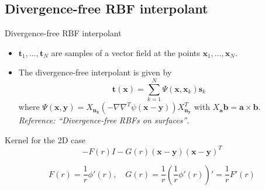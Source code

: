 \documentclass{beamer}
\begin{document}
\subsection{Divergence-free RBF interpolant}
\begin{frame}{Divergence-free RBF interpolant}
  \begin{itemize}
    \item $\mathbf{t}_1,\ldots,\mathbf{t}_N$ are samples of a vector field at
      the points $\mathbf{x}_1,\ldots,\mathbf{x}_N$.
      
    \item The divergence-free interpolant is given by
      \begin{equation*}
	\mathbf{t}(\mathbf{x}) = \sum_{k = 1}^{N}
	{\Psi(\mathbf{x},\mathbf{x}_k)\mathbf{s}_k}
      \end{equation*}
      where $\Psi(\mathbf{x},\mathbf{y}) = X_\mathbf{n_x}
      (-\nabla\nabla^T\psi(\mathbf{x} - \mathbf{y}))X_{\mathbf{n_y}}^T$ with
      $X_\mathbf{a}\mathbf{b} = \mathbf{a}\times\mathbf{b}$. \emph{Reference:
	``Divergence-free RBFs on surfaces''}.
  \end{itemize}
\end{frame}

\begin{frame}{Kernel for the 2D case}
  \begin{equation*}
    -F(r)I - G(r)(\mathbf{x} - \mathbf{y})(\mathbf{x} - \mathbf{y})^T
  \end{equation*}

  \begin{equation*}
    F(r) = \frac{1}{r}\phi'(r), \quad G(r) = 
    \frac{1}{r}\left(\frac{1}{r}\phi'(r)\right)' = \frac{1}{r}F'(r)
  \end{equation*}
\end{frame}
\end{document}
